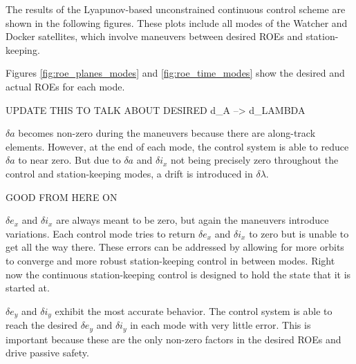 The results of the Lyapunov-based unconstrained continuous control scheme are shown in the following figures. These plots include all modes of the Watcher and Docker satellites, which involve maneuvers between desired ROEs and station-keeping.

Figures \ref{fig:roe_planes_modes} and \ref{fig:roe_time_modes} show the desired and actual ROEs for each mode. 

UPDATE THIS TO TALK ABOUT DESIRED d_A --> d_LAMBDA

$\delta a$ becomes non-zero during the maneuvers because there are along-track elements. However, at the end of each mode, the control system is able to reduce $\delta a$ to near zero. But due to $\delta a$ and $\delta i_x$ not being precisely zero throughout the control and station-keeping modes, a drift is introduced in $\delta \lambda$. 

GOOD FROM HERE ON

$\delta e_x$ and $\delta i_x$ are always meant to be zero, but again the maneuvers introduce variations. Each control mode tries to return $\delta e_x$ and $\delta i_x$ to zero but is unable to get all the way there. These errors can be addressed by allowing for more orbits to converge and more robust station-keeping control in between modes. Right now the continuous station-keeping control is designed to hold the state that it is started at. 

$\delta e_y$ and $\delta i_y$ exhibit the most accurate behavior. The control system is able to reach the desired $\delta e_y$ and $\delta i_y$ in each mode with very little error. This is important because these are the only non-zero factors in the desired ROEs and drive passive safety. 

